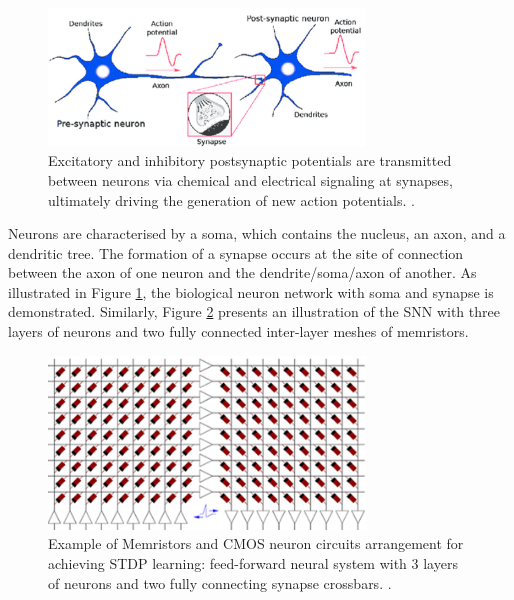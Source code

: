 \begin{figure}[htbp!] 
\centering    
\includegraphics[width=0.75\textwidth]{Chapter6/Figs/a.png}
\caption[Excitatory and inhibitory postsynaptic potentials are transmitted between neurons via chemical and electrical signaling at synapses.]{Excitatory and inhibitory postsynaptic potentials are transmitted between neurons via chemical and electrical signaling at synapses, ultimately driving the generation of new action potentials. \cite{burr2017neuromorphic}.}
\label{fig:6a}
\end{figure}

\noindent Neurons are characterised by a soma, which contains the nucleus, an axon, and a dendritic tree. The formation of a synapse occurs at the site of connection between the axon of one neuron and the dendrite/soma/axon of another. As illustrated in Figure \ref{fig:6a}, the biological neuron network with soma and synapse is demonstrated. Similarly, Figure \ref{fig:6b} presents an illustration of the SNN with three layers of neurons and two fully connected inter-layer meshes of memristors. \\

\begin{figure}[htbp!] 
    \centering    
    \includegraphics[width=0.75\textwidth]{Chapter6/Figs/b.png}
    \caption[xample of Memristors and CMOS neuron circuits arrangement for achieving STDP learning.]{Example of Memristors and CMOS neuron circuits arrangement for achieving STDP learning: feed-forward neural system with 3 layers of neurons and two fully connecting synapse crossbars. \cite{saighi2015plasticity}.}
    \label{fig:6b}
\end{figure}

